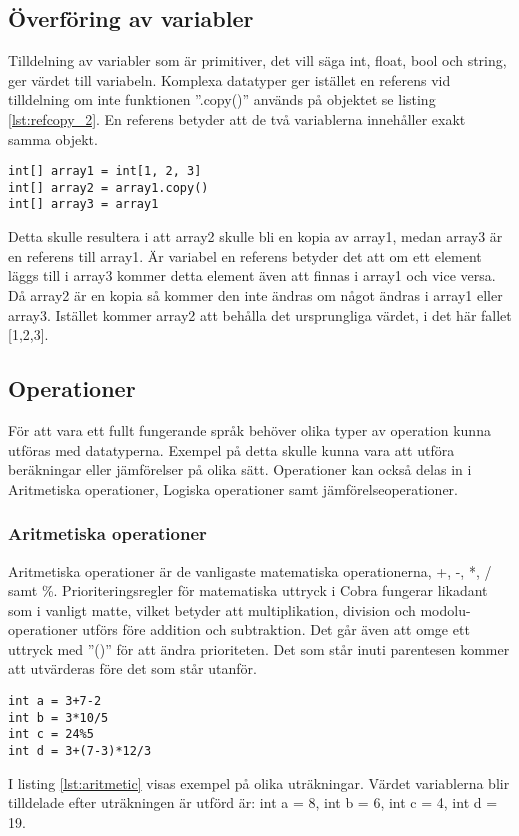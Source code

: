 \documentclass{TDP003mall}
\begin{document}
\subsection{Överföring av variabler}
Tilldelning av variabler som är primitiver, det vill säga int, float, bool och string, ger värdet till variabeln. Komplexa datatyper ger istället en referens vid tilldelning om inte funktionen ''.copy()'' används på objektet se listing \ref{lst:refcopy_2}.
En referens betyder att de två variablerna innehåller exakt samma objekt.
\begin{lstlisting}[caption=Referens eller kopia-exempel, label=lst:refcopy_2]
int[] array1 = int[1, 2, 3]
int[] array2 = array1.copy()
int[] array3 = array1
\end{lstlisting}
Detta skulle resultera i att array2 skulle bli en kopia av array1, medan array3 är en referens till array1.
Är variabel en referens betyder det att om ett element läggs till i array3 kommer detta element även att finnas i array1 och vice versa.
Då array2 är en kopia så kommer den inte ändras om något ändras i array1 eller array3.
Istället kommer array2 att behålla det ursprungliga värdet, i det här fallet [1,2,3].

\subsection{Operationer}
För att vara ett fullt fungerande språk behöver olika typer av operation kunna utföras med datatyperna.
Exempel på detta skulle kunna vara att utföra beräkningar eller jämförelser på olika sätt.
Operationer kan också delas in i Aritmetiska operationer, Logiska operationer samt jämförelseoperationer.
\subsubsection{Aritmetiska operationer}
Aritmetiska operationer är de vanligaste matematiska operationerna, +, -, *, / samt \%. 
Prioriteringsregler för matematiska uttryck i Cobra fungerar likadant som i vanligt matte, vilket betyder att multiplikation, division och modolu-operationer utförs före addition och subtraktion. 
Det går även att omge ett uttryck med ''()'' för att ändra prioriteten. 
Det som står inuti parentesen kommer att utvärderas före det som står utanför.

\begin{lstlisting}[caption=Aritmetiska operationer-exempel, label=lst:aritmetic]
int a = 3+7-2
int b = 3*10/5
int c = 24%5
int d = 3+(7-3)*12/3
\end{lstlisting}
I listing \ref{lst:aritmetic} visas exempel på olika uträkningar. Värdet variablerna blir tilldelade efter uträkningen är utförd är:
int a = 8,
int b = 6,
int c = 4,
int d = 19.
\end{document}
